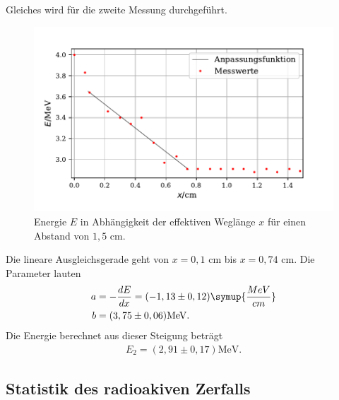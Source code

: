 Gleiches wird für die zweite Messung durchgeführt. 
\begin{figure}[H]
  \centering
  \includegraphics{plot4.pdf}
  \caption{Energie $E$ in Abhängigkeit der effektiven Weglänge $x$ für einen Abstand von $1,5$ $\si{\cm}$. }
  \label{fig:plot}
\end{figure}
\noindent Die lineare Ausgleichsgerade geht von $x=0,1$ $\si{\cm}$ bis $x=0,74$ $\si{\cm}$. Die Parameter lauten
\begin{align*}
a &= -\frac{dE}{dx} = (-1,13 \pm 0,12) \symup{\frac{MeV}{cm}} \\
b &= (3,75 \pm 0,06) \si{\MeV}.
\end{align*}
Die Energie berechnet aus dieser Steigung beträgt
\begin{align*}
E_2 = (2,91 \pm 0,17) \si{\MeV}. %
\end{align*}



\subsection{Statistik des radioakiven Zerfalls}

